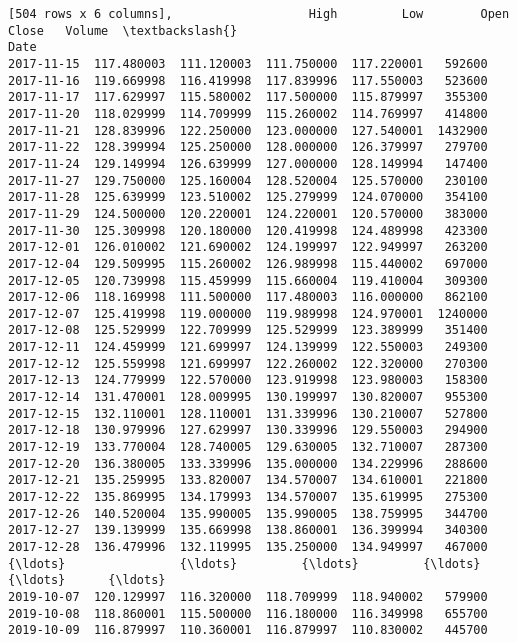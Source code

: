 \documentclass[11pt]{article}
\begin{document}
\begin{Verbatim}[commandchars=\\\{\}]
[504 rows x 6 columns],                   High         Low        Open       Close   Volume  \textbackslash{}
Date                                                                  
2017-11-15  117.480003  111.120003  111.750000  117.220001   592600   
2017-11-16  119.669998  116.419998  117.839996  117.550003   523600   
2017-11-17  117.629997  115.580002  117.500000  115.879997   355300   
2017-11-20  118.029999  114.709999  115.260002  114.769997   414800   
2017-11-21  128.839996  122.250000  123.000000  127.540001  1432900   
2017-11-22  128.399994  125.250000  128.000000  126.379997   279700   
2017-11-24  129.149994  126.639999  127.000000  128.149994   147400   
2017-11-27  129.750000  125.160004  128.520004  125.570000   230100   
2017-11-28  125.639999  123.510002  125.279999  124.070000   354100   
2017-11-29  124.500000  120.220001  124.220001  120.570000   383000   
2017-11-30  125.309998  120.180000  120.419998  124.489998   423300   
2017-12-01  126.010002  121.690002  124.199997  122.949997   263200   
2017-12-04  129.509995  115.260002  126.989998  115.440002   697000   
2017-12-05  120.739998  115.459999  115.660004  119.410004   309300   
2017-12-06  118.169998  111.500000  117.480003  116.000000   862100   
2017-12-07  125.419998  119.000000  119.989998  124.970001  1240000   
2017-12-08  125.529999  122.709999  125.529999  123.389999   351400   
2017-12-11  124.459999  121.699997  124.139999  122.550003   249300   
2017-12-12  125.559998  121.699997  122.260002  122.320000   270300   
2017-12-13  124.779999  122.570000  123.919998  123.980003   158300   
2017-12-14  131.470001  128.009995  130.199997  130.820007   955300   
2017-12-15  132.110001  128.110001  131.339996  130.210007   527800   
2017-12-18  130.979996  127.629997  130.339996  129.550003   294900   
2017-12-19  133.770004  128.740005  129.630005  132.710007   287300   
2017-12-20  136.380005  133.339996  135.000000  134.229996   288600   
2017-12-21  135.259995  133.820007  134.570007  134.610001   221800   
2017-12-22  135.869995  134.179993  134.570007  135.619995   275300   
2017-12-26  140.520004  135.990005  135.990005  138.759995   344700   
2017-12-27  139.139999  135.669998  138.860001  136.399994   340300   
2017-12-28  136.479996  132.119995  135.250000  134.949997   467000   
{\ldots}                {\ldots}         {\ldots}         {\ldots}         {\ldots}      {\ldots}   
2019-10-07  120.129997  116.320000  118.709999  118.940002   579900   
2019-10-08  118.860001  115.500000  116.180000  116.349998   655700   
2019-10-09  116.879997  110.360001  116.879997  110.830002   445700   

\end{Verbatim}
\end{document}
